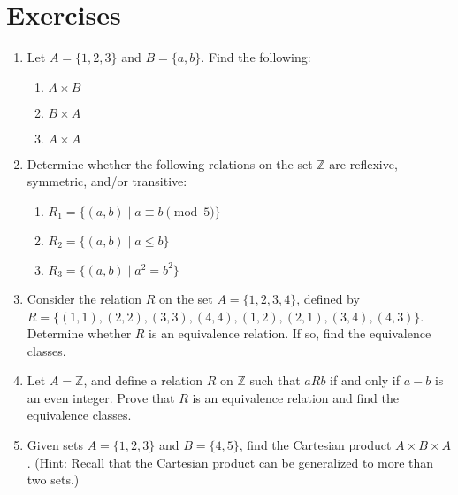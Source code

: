 \section*{Exercises}

\begin{enumerate}
\item
Let $A = \{1, 2, 3\}$ and $B = \{a, b\}$. Find the following:

\begin{enumerate}
    \item $A \times B$
    \item $B \times A$
    \item $A \times A$
\end{enumerate}

\item
Determine whether the following relations on the set $\mathbb{Z}$ are reflexive, symmetric, and/or transitive:

\begin{enumerate}
    \item $R_1 = \{(a, b) \mid a \equiv b \pmod{5}\}$
    \item $R_2 = \{(a, b) \mid a \leq b\}$
    \item $R_3 = \{(a, b) \mid a^2 = b^2\}$
\end{enumerate}

\item
Consider the relation $R$ on the set $A = \{1, 2, 3, 4\}$, defined by $R = \{(1, 1), (2, 2), (3, 3), (4, 4), (1, 2), (2, 1), (3, 4), (4, 3)\}$. Determine whether $R$ is an equivalence relation. If so, find the equivalence classes.

\item
Let $A = \mathbb{Z}$, and define a relation $R$ on $\mathbb{Z}$ such that $aRb$ if and only if $a - b$ is an even integer. Prove that $R$ is an equivalence relation and find the equivalence classes.

\item
Given sets $A = \{1, 2, 3\}$ and $B = \{4, 5\}$, find the Cartesian product $A \times B \times A$. (Hint: Recall that the Cartesian product can be generalized to more than two sets.)
\end{enumerate}
